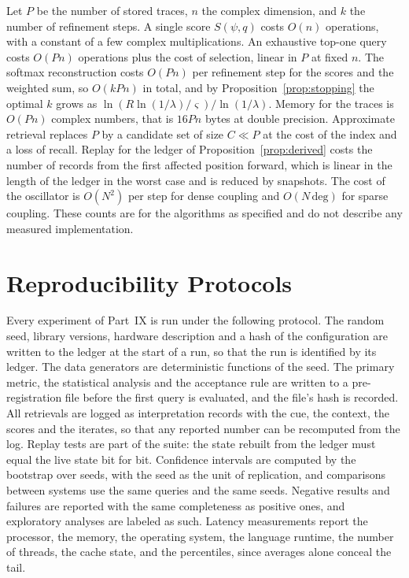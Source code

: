 Let $P$ be the number of stored traces, $n$ the complex dimension, and $k$ the number of refinement steps. A single score $S(\psi,q)$ costs $O(n)$ operations, with a constant of a few complex multiplications. An exhaustive top-one query costs $O(Pn)$ operations plus the cost of selection, linear in $P$ at fixed $n$. The softmax reconstruction costs $O(Pn)$ per refinement step for the scores and the weighted sum, so $O(kPn)$ in total, and by Proposition~\ref{prop:stopping} the optimal $k$ grows as $\ln(R\ln(1/\lambda)/\varsigma)/\ln(1/\lambda)$. Memory for the traces is $O(Pn)$ complex numbers, that is $16Pn$ bytes at double precision. Approximate retrieval replaces $P$ by a candidate set of size $C\ll P$ at the cost of the index and a loss of recall. Replay for the ledger of Proposition~\ref{prop:derived} costs the number of records from the first affected position forward, which is linear in the length of the ledger in the worst case and is reduced by snapshots. The cost of the oscillator is $O(N^2)$ per step for dense coupling and $O(N\,\mathrm{deg})$ for sparse coupling. These counts are for the algorithms as specified and do not describe any measured implementation.

\chapter{Reproducibility Protocols}\label{app:repro}

Every experiment of Part~IX is run under the following protocol. The random seed, library versions, hardware description and a hash of the configuration are written to the ledger at the start of a run, so that the run is identified by its ledger. The data generators are deterministic functions of the seed. The primary metric, the statistical analysis and the acceptance rule are written to a pre-registration file before the first query is evaluated, and the file's hash is recorded. All retrievals are logged as interpretation records with the cue, the context, the scores and the iterates, so that any reported number can be recomputed from the log. Replay tests are part of the suite: the state rebuilt from the ledger must equal the live state bit for bit. Confidence intervals are computed by the bootstrap over seeds, with the seed as the unit of replication, and comparisons between systems use the same queries and the same seeds. Negative results and failures are reported with the same completeness as positive ones, and exploratory analyses are labeled as such. Latency measurements report the processor, the memory, the operating system, the language runtime, the number of threads, the cache state, and the percentiles, since averages alone conceal the tail.

